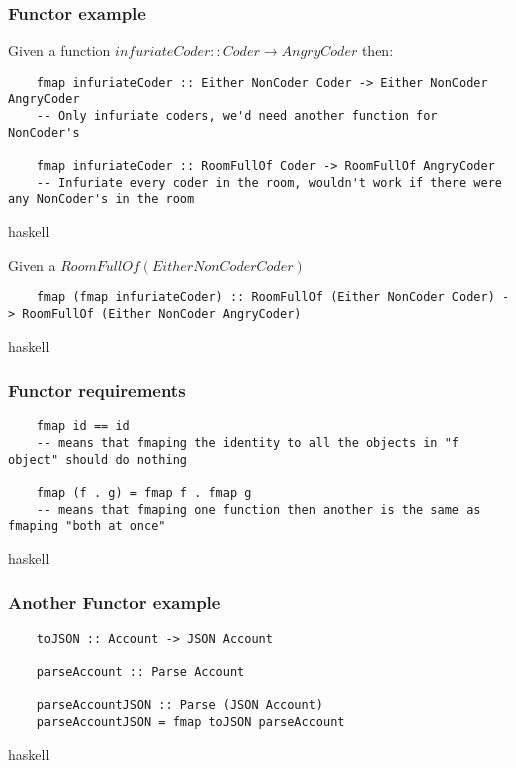 \documentclass{beamer}
\begin{document}
\begin{frame}
  \frametitle{Functor example}

  Given a function $infuriateCoder :: Coder \to AngryCoder$ then:

  \begin{verbatim}
    fmap infuriateCoder :: Either NonCoder Coder -> Either NonCoder AngryCoder
    -- Only infuriate coders, we'd need another function for NonCoder's

    fmap infuriateCoder :: RoomFullOf Coder -> RoomFullOf AngryCoder
    -- Infuriate every coder in the room, wouldn't work if there were any NonCoder's in the room
  \end{verbatim}{haskell}


  Given a $RoomFullOf (Either NonCoder Coder)$

  \begin{verbatim}
    fmap (fmap infuriateCoder) :: RoomFullOf (Either NonCoder Coder) -> RoomFullOf (Either NonCoder AngryCoder)
  \end{verbatim}{haskell}

\end{frame}


\begin{frame}
  \frametitle{Functor requirements}

  \begin{verbatim}
    fmap id == id
    -- means that fmaping the identity to all the objects in "f object" should do nothing

    fmap (f . g) = fmap f . fmap g
    -- means that fmaping one function then another is the same as fmaping "both at once"
  \end{verbatim}{haskell}

\end{frame}


\begin{frame}
  \frametitle{Another Functor example}

  \begin{verbatim}
    toJSON :: Account -> JSON Account

    parseAccount :: Parse Account

    parseAccountJSON :: Parse (JSON Account)
    parseAccountJSON = fmap toJSON parseAccount
  \end{verbatim}{haskell}

\end{frame}
\end{document}
